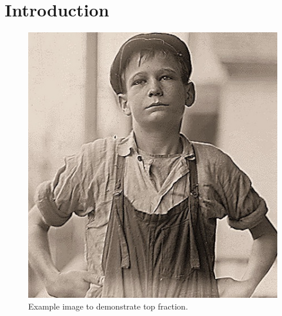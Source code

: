 \documentclass[twoside,twocolumn]{book}
\begin{document}
\chapter{Introduction}
\thispagestyle{grid}
\begin{figure}[tpb]
\centering
\includegraphics[height=\columnwidth]{./chapters/hine04-x}
\caption{Example image to demonstrate top fraction.}
\end{figure}

\lipsum[1]
\lipsum[1]
\end{document}
